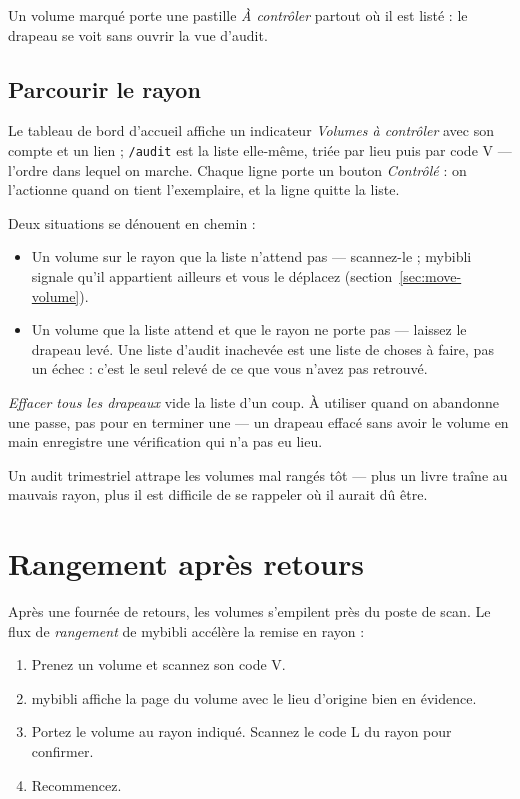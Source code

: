 Un volume marqué porte une pastille \emph{À contrôler} partout où il
est listé : le drapeau se voit sans ouvrir la vue d'audit.

\subsection*{Parcourir le rayon}

Le tableau de bord d'accueil affiche un indicateur \emph{Volumes à
contrôler} avec son compte et un lien ; \texttt{/audit} est la liste
elle-même, triée par lieu puis par code V — l'ordre dans lequel on
marche. Chaque ligne porte un bouton \emph{Contrôlé} : on l'actionne
quand on tient l'exemplaire, et la ligne quitte la liste.

Deux situations se dénouent en chemin :

\begin{itemize}
  \item Un volume sur le rayon que la liste n'attend pas — scannez-le ;
        mybibli signale qu'il appartient ailleurs et vous le déplacez
        (section~\ref{sec:move-volume}).
  \item Un volume que la liste attend et que le rayon ne porte pas —
        laissez le drapeau levé. Une liste d'audit inachevée est une
        liste de choses à faire, pas un échec : c'est le seul relevé de
        ce que vous n'avez pas retrouvé.
\end{itemize}

\emph{Effacer tous les drapeaux} vide la liste d'un coup. À utiliser
quand on abandonne une passe, pas pour en terminer une — un drapeau
effacé sans avoir le volume en main enregistre une vérification qui
n'a pas eu lieu.

\begin{tip}
Un audit trimestriel attrape les volumes mal rangés tôt — plus un
livre traîne au mauvais rayon, plus il est difficile de se rappeler
où il aurait dû être.
\end{tip}

\section{Rangement après retours}\label{sec:shelving}

Après une fournée de retours, les volumes s'empilent près du poste
de scan. Le flux de \emph{rangement} de mybibli
accélère la remise en rayon :

\begin{enumerate}
  \item Prenez un volume et scannez son code V.
  \item mybibli affiche la page du volume avec le lieu d'origine
        bien en évidence.
  \item Portez le volume au rayon indiqué. Scannez le code L du
        rayon pour confirmer.
  \item Recommencez.
\end{enumerate}

